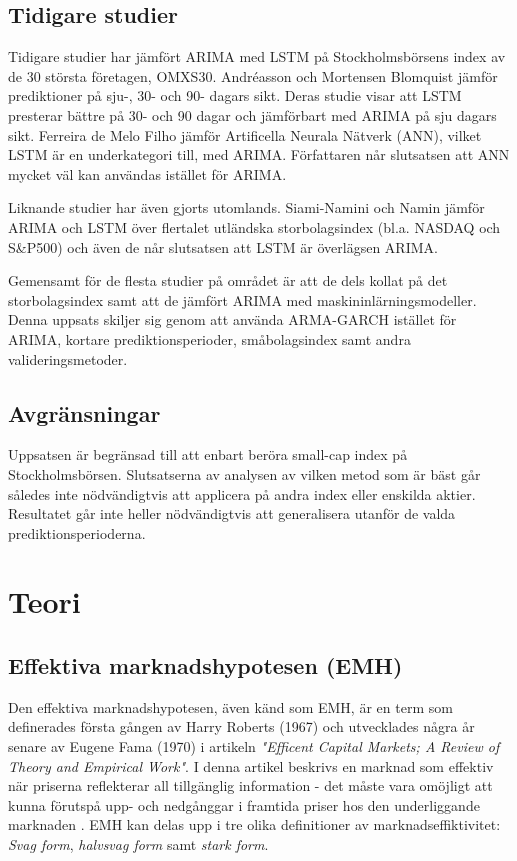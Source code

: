 \documentclass[12pt]{article}
\begin{document}
\subsection{Tidigare studier}
Tidigare studier har jämfört ARIMA med LSTM på Stockholmsbörsens index av de 30 största företagen, OMXS30. Andréasson och Mortensen Blomquist \parencite*{andreasson2020forecasting} jämför prediktioner på sju-, 30- och 90- dagars sikt. Deras studie visar att LSTM presterar bättre på 30- och 90 dagar och jämförbart med ARIMA på sju dagars sikt. Ferreira de Melo Filho \parencite*{ferreira2019predicting} jämför Artificella Neurala Nätverk (ANN), vilket LSTM är en underkategori till, med ARIMA. Författaren når slutsatsen att ANN mycket väl kan användas istället för ARIMA. \par 
Liknande studier har även gjorts utomlands. Siami-Namini och Namin \parencite*{siami2018forecasting} jämför ARIMA och LSTM över flertalet utländska storbolagsindex (bl.a. NASDAQ och S\&P500) och även de når slutsatsen att LSTM är överlägsen ARIMA.\par 
Gemensamt för de flesta studier på området är att de dels kollat på det storbolagsindex samt att de jämfört ARIMA med maskininlärningsmodeller. Denna uppsats skiljer sig genom att använda ARMA-GARCH istället för ARIMA, kortare prediktionsperioder, småbolagsindex samt andra valideringsmetoder.

\subsection{Avgränsningar}
Uppsatsen är begränsad till att enbart beröra small-cap index på Stockholmsbörsen. Slutsatserna av analysen av vilken metod som är bäst går således inte nödvändigtvis att applicera på andra index eller enskilda aktier. Resultatet går inte heller nödvändigtvis att generalisera utanför de valda prediktionsperioderna.

\newpage
\section{Teori}
\subsection{Effektiva marknadshypotesen (EMH)}
Den effektiva marknadshypotesen, även känd som EMH, är en term som definerades första gången av Harry Roberts (1967) och utvecklades några år senare av Eugene Fama (1970) \parencite{EMHhistory} i artikeln \emph{"Efficent Capital Markets; A Review of Theory and Empirical Work"}. I denna artikel beskrivs en marknad som effektiv när priserna reflekterar all tillgänglig information - det måste vara omöjligt att kunna förutspå upp- och nedgånggar i framtida priser hos den underliggande marknaden \parencite{Fama1970}. EMH kan delas upp i tre olika definitioner av marknadseffiktivitet: \emph{Svag form}, \emph{halvsvag form} samt \emph{stark form}. 
\end{document}
